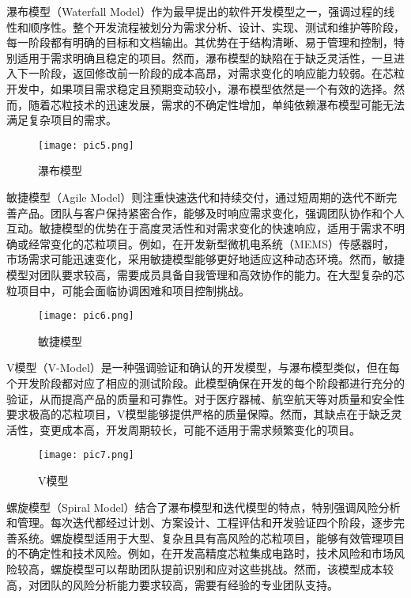 \documentclass[bachelor]{thesis-uestc}
\begin{document}
瀑布模型（Waterfall Model）作为最早提出的软件开发模型之一，强调过程的线性和顺序性。整个开发流程被划分为需求分析、设计、实现、测试和维护等阶段，每一阶段都有明确的目标和文档输出。其优势在于结构清晰、易于管理和控制，特别适用于需求明确且稳定的项目。然而，瀑布模型的缺陷在于缺乏灵活性，一旦进入下一阶段，返回修改前一阶段的成本高昂，对需求变化的响应能力较弱。在芯粒开发中，如果项目需求稳定且预期变动较小，瀑布模型依然是一个有效的选择。然而，随着芯粒技术的迅速发展，需求的不确定性增加，单纯依赖瀑布模型可能无法满足复杂项目的需求。

\begin{figure}[h]
    \texttt{[image: pic5.png]}
    \caption{瀑布模型}
    \label{pic5}
    \end{figure}


敏捷模型（Agile Model）则注重快速迭代和持续交付，通过短周期的迭代不断完善产品。团队与客户保持紧密合作，能够及时响应需求变化，强调团队协作和个人互动。敏捷模型的优势在于高度灵活性和对需求变化的快速响应，适用于需求不明确或经常变化的芯粒项目。例如，在开发新型微机电系统（MEMS）传感器时，市场需求可能迅速变化，采用敏捷模型能够更好地适应这种动态环境。然而，敏捷模型对团队要求较高，需要成员具备自我管理和高效协作的能力。在大型复杂的芯粒项目中，可能会面临协调困难和项目控制挑战。


\begin{figure}[h]
    \texttt{[image: pic6.png]}
    \caption{敏捷模型}
    \label{pic6}
    \end{figure}

V模型（V-Model）是一种强调验证和确认的开发模型，与瀑布模型类似，但在每个开发阶段都对应了相应的测试阶段。此模型确保在开发的每个阶段都进行充分的验证，从而提高产品的质量和可靠性。对于医疗器械、航空航天等对质量和安全性要求极高的芯粒项目，V模型能够提供严格的质量保障。然而，其缺点在于缺乏灵活性，变更成本高，开发周期较长，可能不适用于需求频繁变化的项目。

\begin{figure}[h]
    \texttt{[image: pic7.png]}
    \caption{V模型}
    \label{pic7}
    \end{figure}

螺旋模型（Spiral Model）结合了瀑布模型和迭代模型的特点，特别强调风险分析和管理。每次迭代都经过计划、方案设计、工程评估和开发验证四个阶段，逐步完善系统。螺旋模型适用于大型、复杂且具有高风险的芯粒项目，能够有效管理项目的不确定性和技术风险。例如，在开发高精度芯粒集成电路时，技术风险和市场风险较高，螺旋模型可以帮助团队提前识别和应对这些挑战。然而，该模型成本较高，对团队的风险分析能力要求较高，需要有经验的专业团队支持。
\end{document}
